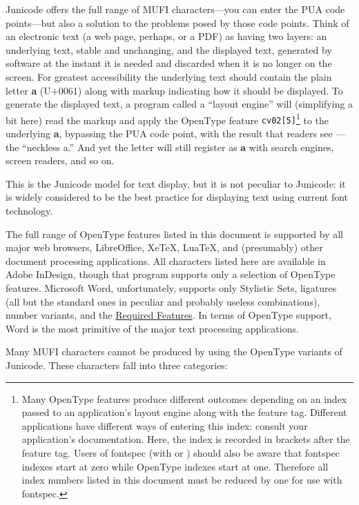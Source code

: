 \documentclass[12pt,letterpaper,openany]{book}
\newcommand\textLetterExample[1]{\textrm{\textbf{\color{BrickRed}#1}}}
\newcommand\textSourceText[1]{{\color{GGOrange}\texttt{#1}}}
\newcommand{\cvd}[3][0]{{\addfontfeature{CharacterVariant=#2:#1}#3}}
\newcounter{Feature}
\begin{document}
Junicode offers the full range of MUFI characters---you can enter the PUA code points---but also a solution to the
problems posed by those code points. Think of an electronic text (a web page, perhaps, or a PDF) as having two layers:
an underlying text, stable and unchanging, and the displayed text, generated by software at the instant it is needed
and discarded when it is no longer on the screen. For greatest accessibility the underlying text should contain the
plain letter \textLetterExample{a} (U+0061) along with markup indicating how it should be displayed. To generate
the displayed text, a program called a ``layout engine'' will (simplifying a bit here) read the markup and apply the
OpenType feature \textSourceText{cv02[5]}\footnote{Many OpenType features produce different outcomes depending on
an index passed to an application’s layout engine along with the feature tag. Different applications have different
ways of entering this index: consult your application’s documentation. Here, the index is recorded in brackets after
the feature tag. Users of fontspec (with {\XeLaTeX} or {\LuaTeX}) should also be aware that fontspec indexes start at zero
while OpenType indexes start at one. Therefore all index numbers listed in this document must be reduced by one for
use with fontspec.\par } to the underlying \textLetterExample{a}, bypassing the PUA code point, with the result that
readers see \textLetterExample{\cvd[4]{2}{a}}{}---the ``neckless a.'' And yet the letter will still register as
\textLetterExample{a} with search engines, screen readers, and so on.

This is the Junicode model for text display, but it is not peculiar to Junicode: it is widely considered to be the best
practice for displaying text using current font technology.

The full range of OpenType features listed in this document is supported by all major web browsers, LibreOffice, XeTeX,
LuaTeX, and (presumably) other document processing applications. All characters listed here are available in Adobe
InDesign, though that program supports only a selection of OpenType features. Microsoft Word, unfortunately, supports
only Stylistic Sets, ligatures (all but the standard ones in peculiar and probably useless combinations), number
variants, and the \hyperlink{req}{Required Features}. In terms of
OpenType support, Word is the most primitive of the major text processing applications.

Many MUFI characters cannot be produced by using the OpenType variants of Junicode. These characters fall into three
categories:
\end{document}
